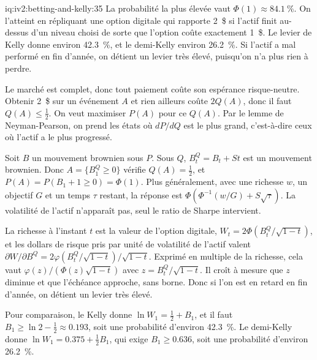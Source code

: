 \begin{solution}{iq:iv2:betting-and-kelly:35}
La probabilité la plus élevée vaut $\Phi(1) \approx 84.1~\%$. On l'atteint en répliquant une option digitale qui rapporte 2~\$ si l'actif finit au-dessus d'un niveau choisi de sorte que l'option coûte exactement 1~\$. Le levier de Kelly donne environ 42.3~\%, et le demi-Kelly environ 26.2~\%. Si l'actif a mal performé en fin d'année, on détient un levier très élevé, puisqu'on n'a plus rien à perdre.

Le marché est complet, donc tout paiement coûte son espérance risque-neutre. Obtenir 2~\$ sur un événement $A$ et rien ailleurs coûte $2Q(A)$, donc il faut $Q(A) \leq \tfrac12$. On veut maximiser $P(A)$ pour ce $Q(A)$. Par le lemme de Neyman-Pearson, on prend les états où $dP/dQ$ est le plus grand, c'est-à-dire ceux où l'actif a le plus progressé.

Soit $B$ un mouvement brownien sous $P$. Sous $Q$, $B^Q_t = B_t + St$ est un mouvement brownien. Donc $A = \{B^Q_1 \geq 0\}$ vérifie $Q(A) = \tfrac12$, et $P(A) = P(B_1 + 1 \geq 0) = \Phi(1)$. Plus généralement, avec une richesse $w$, un objectif $G$ et un temps $\tau$ restant, la réponse est $\Phi\left(\Phi^{-1}(w/G) + S\sqrt\tau\right)$. La volatilité de l'actif n'apparaît pas, seul le ratio de Sharpe intervient.

La richesse à l'instant $t$ est la valeur de l'option digitale, $W_t = 2\Phi\left(B^Q_t/\sqrt{1 - t}\right)$, et les dollars de risque pris par unité de volatilité de l'actif valent $\partial W/\partial B^Q = 2\varphi\left(B^Q_t/\sqrt{1 - t}\right)/\sqrt{1 - t}$. Exprimé en multiple de la richesse, cela vaut $\varphi(z)/\left(\Phi(z)\sqrt{1 - t}\right)$ avec $z = B^Q_t/\sqrt{1 - t}$. Il croît à mesure que $z$ diminue et que l'échéance approche, sans borne. Donc si l'on est en retard en fin d'année, on détient un levier très élevé.

Pour comparaison, le Kelly donne $\ln W_1 = \tfrac12 + B_1$, et il faut $B_1 \geq \ln 2 - \tfrac12 \approx 0.193$, soit une probabilité d'environ 42.3~\%. Le demi-Kelly donne $\ln W_1 = 0.375 + \tfrac12 B_1$, qui exige $B_1 \geq 0.636$, soit une probabilité d'environ 26.2~\%.

\end{solution}
